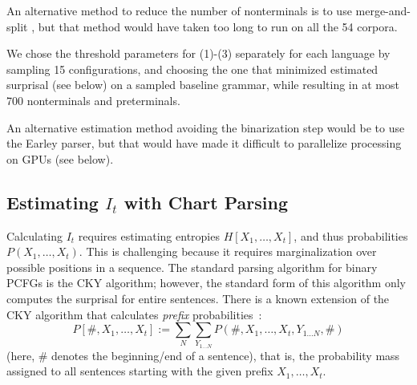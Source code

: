 \documentclass[11pt,letterpaper]{article}
\begin{document}
An alternative method to reduce the number of nonterminals is to use merge-and-split \citep{DBLP:conf/aaai/PetrovK07}, but that method would have taken too long to run on all the 54 corpora.

We chose the threshold parameters for (1)-(3) separately for each language by sampling 15 configurations, and choosing the one that minimized estimated surprisal (see below) on a sampled baseline grammar, while resulting in at most 700 nonterminals and preterminals.

An alternative estimation method avoiding the binarization step would be to use the Earley parser, but that would have made it difficult to parallelize processing on GPUs (see below).

\subsection{Estimating $I_t$ with Chart Parsing}

Calculating $I_t$ requires estimating entropies $H[X_1, \dots, X_t]$, and thus probabilities $P(X_1, \dots, X_t)$.
This is challenging because it requires marginalization over possible positions in a sequence.
The standard parsing algorithm for binary PCFGs is the CKY algorithm; however, the standard form of this algorithm only computes the surprisal for entire sentences.
There is a known extension of the CKY algorithm that calculates \emph{prefix} probabilities~\citep{DBLP:journals/coling/JelinekL91,DBLP:journals/coling/Stolcke95,DBLP:journals/coling/Goodman99}:
\begin{equation}
P[\#, X_1, \dots, X_t] := \sum_N \sum_{Y_{1\dots N}} P(\#, X_1, \dots, X_t, Y_{1\dots N}, \#)
\end{equation}
(here, $\#$ denotes the beginning/end of a sentence), that is, the probability mass assigned to all sentences starting with the given prefix $X_1, \dots, X_t$.
\end{document}

